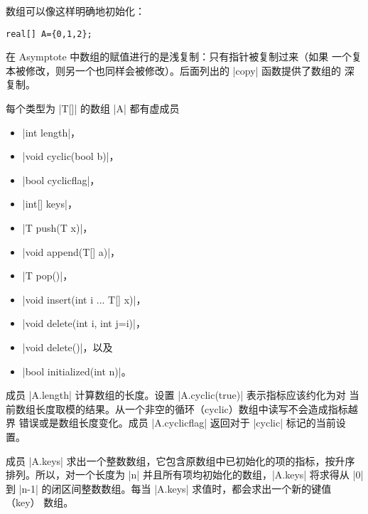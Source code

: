 \documentclass{ctexbook}
\newcommand*\prgname[1]{\textsf{#1}}
\begin{document}
{{{数组可以像这样明确地初始化：
\begin{lstlisting}
real[] A={0,1,2};
\end{lstlisting}

在 \prgname{Asymptote} 中数组的赋值进行的是浅复制：只有指针被复制过来（如果
一个复本被修改，则另一个也同样会被修改）。后面列出的 |copy| 函数提供了数组的
深复制。

每个类型为 |T[]| 的数组 |A| 都有虚成员
\begin{itemize}
  \item |int length|，
  \item |void cyclic(bool b)|，
  \item |bool cyclicflag|，
  \item |int[] keys|，
  \item |T push(T x)|，
  \item |void append(T[] a)|，
  \item |T pop()|，
  \item |void insert(int i ... T[] x)|，
  \item |void delete(int i, int j=i)|，
  \item |void delete()|，以及
  \item |bool initialized(int n)|。
\end{itemize}

成员 |A.length| 计算数组的长度。设置 |A.cyclic(true)| 表示指标应该约化为对
当前数组长度取模的结果。从一个非空的循环（cyclic）数组中读写不会造成指标越界
错误或是数组长度变化。成员 |A.cyclicflag| 返回对于 |cyclic| 标记的当前设置。

成员 |A.keys| 求出一个整数数组，它包含原数组中已初始化的项的指标，按升序
排列。所以，对一个长度为 |n| 并且所有项均初始化的数组，|A.keys| 将求得从 |0|
到 |n-1| 的闭区间整数数组。每当 |A.keys| 求值时，都会求出一个新的键值（key）
数组。

}}}
\end{document}
